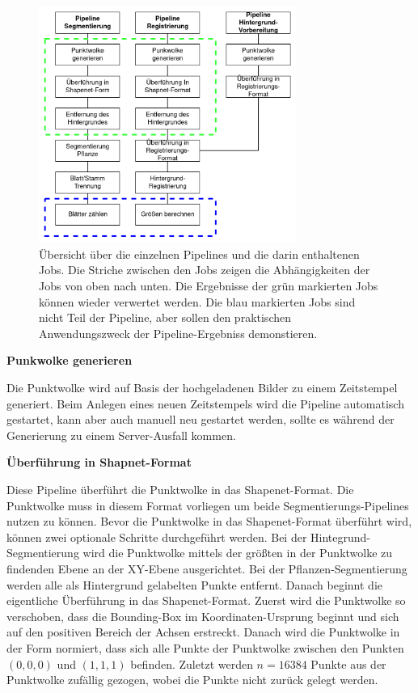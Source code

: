 \documentclass[12pt,titlepage, twoside]{article}
\begin{document}
\begin{figure}
    \centering
    \includegraphics[width=0.75\textwidth]{./Images/Pipelines.png}
    \caption{Übersicht über die einzelnen Pipelines und die darin enthaltenen Jobs. Die Striche zwischen den Jobs zeigen die Abhängigkeiten der Jobs von oben nach unten.
    Die Ergebnisse der grün markierten Jobs können wieder verwertet werden. 
    Die blau markierten Jobs sind nicht Teil der Pipeline, aber sollen den praktischen Anwendungszweck der Pipeline-Ergebniss demonstieren.}
    \label{fig:Pipelines}
\end{figure}

\textbf{Punkwolke generieren}

Die Punktwolke wird auf Basis der hochgeladenen Bilder zu einem Zeitstempel generiert. 
Beim Anlegen eines neuen Zeitstempels wird die Pipeline automatisch gestartet, kann aber auch manuell neu gestartet werden, sollte es während der Generierung zu einem Server-Ausfall kommen.

\textbf{Überführung in Shapnet-Format}


Diese Pipeline überführt die Punktwolke in das Shapenet-Format. Die Punktwolke muss in diesem Format vorliegen um beide Segmentierungs-Pipelines nutzen zu können.
Bevor die Punktwolke in das Shapenet-Format überführt wird, können zwei optionale Schritte durchgeführt werden.
Bei der Hintegrund-Segmentierung wird die Punktwolke mittels der größten in der Punktwolke zu findenden Ebene an der XY-Ebene ausgerichtet.
Bei der Pflanzen-Segmentierung werden alle als Hintergrund gelabelten Punkte entfernt. Danach beginnt die eigentliche Überführung in das Shapenet-Format.
Zuerst wird die Punktwolke so verschoben, dass die Bounding-Box im Koordinaten-Ursprung beginnt und sich auf den positiven Bereich der Achsen erstreckt.
Danach wird die Punktwolke in der Form normiert, dass sich alle Punkte der Punktwolke zwischen den Punkten $(0,0,0)$ und $(1,1,1)$ befinden.
Zuletzt werden $n=16384$ Punkte aus der Punktwolke zufällig gezogen, wobei die Punkte nicht zurück gelegt werden.
\end{document}

